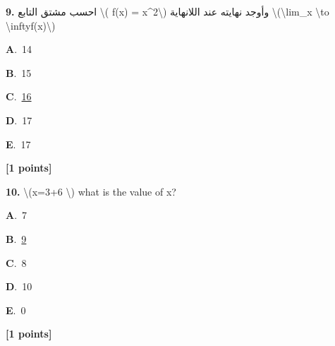 \documentclass[12pt]{article}
\newcommand{\choice}[3]{%
  \noindent\textbf{#1}.~#2\hfill#3\par\vspace{0.25em}
}
\begin{document}
\noindent \textbf{\textenglish{9.}} {\textarabic{احسب مشتق التابع \textbackslash{}( f(x) = x\^{}2\textbackslash{}) وأوجد نهايته عند اللانهاية \textbackslash{}(\textbackslash{}lim\_{x \textbackslash{}to \textbackslash{}infty}f(x)\textbackslash{})}}

\noindent\choice{A}{{\textenglish{14}}}{}
\noindent\choice{B}{{\textenglish{15}}}{}
\noindent\choice{C}{\underline{{\textenglish{16}}}}{}
\noindent\choice{D}{{\textenglish{17}}}{}
\noindent\choice{E}{{\textenglish{17}}}{}
\hfill \textbf{[1 points]}\vspace{0.5em}

\noindent \textbf{\textenglish{10.}} {\textenglish{\textbackslash{}(x=3+6 \textbackslash{}) what is the value of x?}}

\noindent\choice{A}{{\textenglish{7}}}{}
\noindent\choice{B}{\underline{{\textenglish{9}}}}{}
\noindent\choice{C}{{\textenglish{8}}}{}
\noindent\choice{D}{{\textenglish{10}}}{}
\noindent\choice{E}{{\textenglish{0}}}{}
\hfill \textbf{[1 points]}\vspace{0.5em}
\end{document}
